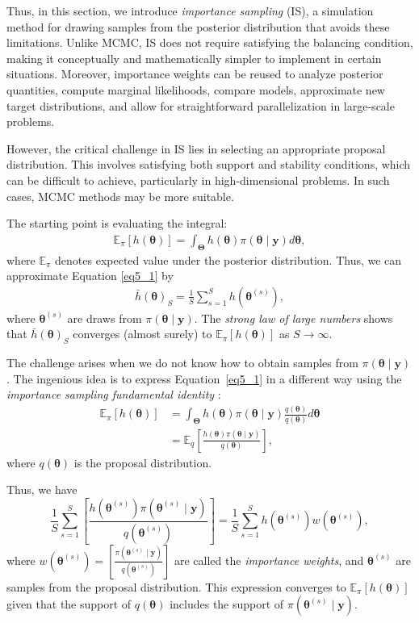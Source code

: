 Thus, in this section, we introduce \textit{importance sampling} (IS), a simulation method for drawing samples from the posterior distribution that avoids these limitations. Unlike MCMC, IS does not require satisfying the balancing condition, making it conceptually and mathematically simpler to implement in certain situations. Moreover, importance weights can be reused to analyze posterior quantities, compute marginal likelihoods, compare models, approximate new target distributions, and allow for straightforward parallelization in large-scale problems.

However, the critical challenge in IS lies in selecting an appropriate proposal distribution. This involves satisfying both support and stability conditions, which can be difficult to achieve, particularly in high-dimensional problems. In such cases, MCMC methods may be more suitable.

The starting point is evaluating the integral:
\begin{align}\label{eq5_1}
	\mathbb{E}_{\pi}[h(\bm{\theta})]=\int_{\bm{\Theta}} h(\bm{\theta}) \pi(\bm{\theta}\mid \bm{y})d\bm{\theta},
\end{align}
where $\mathbb{E}_{\pi}$ denotes expected value under the posterior distribution.
Thus, we can approximate Equation \ref{eq5_1} by
\begin{align}\label{eq5_2}
	\bar{h}(\bm{\theta})_S=\frac{1}{S}\sum_{s=1}^S h(\bm{\theta}^{(s)}), 
\end{align}
where $\bm{\theta}^{(s)}$ are draws from $\pi(\bm{\theta}\mid \bm{y})$. The \textit{strong law of large numbers} shows that $\bar{h}(\bm{\theta})_S$ converges (almost surely) to $\mathbb{E}_{\pi}[h(\bm{\theta})]$ as $S \rightarrow \infty$.

The challenge arises when we do not know how to obtain samples from $\pi(\bm{\theta}\mid \bm{y})$. The ingenious idea is to express Equation~\ref{eq5_1} in a different way using the \textit{importance sampling fundamental identity} \cite[Chap.~3]{robert2011monte}:
\begin{align}\label{eq5_3}
	\mathbb{E}_{\pi}[h(\bm{\theta})]&=\int_{\bm{\Theta}} h(\bm{\theta}) \pi(\bm{\theta}\mid \bm{y})\frac{q(\bm{\theta})}{q(\bm{\theta})}d\bm{\theta}\nonumber\\
	&=\mathbb{E}_{q}\left[\frac{h(\bm{\theta})\pi(\bm{\theta}\mid \bm{y})}{q(\bm{\theta})}\right],
\end{align}   
where $q(\bm{\theta})$ is the proposal distribution.

Thus, we have $$\frac{1}{S}\sum_{s=1}^S \left[\frac{h(\bm{\theta}^{(s)})\pi(\bm{\theta}^{(s)}\mid \bm{y})}{q(\bm{\theta}^{(s)})}\right]= \frac{1}{S}\sum_{s=1}^S h(\bm{\theta}^{(s)})w(\bm{\theta}^{(s)}),$$ where $w(\bm{\theta}^{(s)})= \left[\frac{\pi(\bm{\theta}^{(s)}\mid \bm{y})}{q(\bm{\theta}^{(s)})}\right]$ are called the \textit{importance weights}, and $\bm{\theta}^{(s)}$ are samples from the proposal distribution. This expression converges to $\mathbb{E}_{\pi}[h(\bm{\theta})]$ given that the support of $q(\bm{\theta})$ includes the support of $\pi(\bm{\theta}^{(s)}\mid \bm{y})$.

